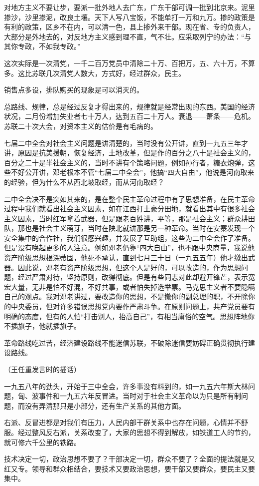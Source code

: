 对地方主义不要让步，要派一批外地人去广东，广东干部可调一批到北京来。泥里掺沙，沙里掺泥，改良土壤。天下人写八宝饭，不能单打一万和九万。掺的政策是有利的政策，区乡不在内，可以清一色，县上掺外来干部。现在省、专的负责人，大部分是外地去的，对反地方主义感到理不直，气不壮。应采取列宁的办法：“与其你专政，不如我专政。”

这次实际是一次清党，一千二百万党员中清除二十万、百把万，五、六十万，不算多。这比苏联几次清党人数大，方式好，经过群众，民主。

销售点多设，排队购买的现象是可以消灭的。

总路线、规律，总是经过反复才得出来的，规律就是经常出现的东西。美国的经济状况，二月份增加失业者七十万人，达到五百二十万人。衰退——萧条——危机。苏联二十次大会，对资本主义的估价是有毛病的。

七届二中全会对社会主义问题是讲清楚的，当时没有公开讲，直到一九五三年才讲，原因是抗美援朝，恢复经济，土地改革，但是作的百分之八十是社会主义的，百分之二十是半社会主义的，当时不讲有个策略问题，例如孙行者，糖衣炮弹，这些不好公开讲，邓老根本不管“七届二中全会”，他搞“四大自由”，他说是河南取来的经验，但为什么不从西北坡取经，而从河南取经？

二中全会决不是突如其来的，是在整个民主革命过程中有了思想准备，在民主革命过程中我们就看出社会主义因素，如在江西打土豪分田地，就看出其中有很多社会主义因素，当时红军拿着武器，但是跟老百姓讲，平等，那是社会主义；群众耕田队，那也是社会主义萌芽，当时在陕北就讲那是另一种革命。当时在安寨发现一个安全集中的合作社，我们很感兴趣，并发展了互助组，这些为二中全会作了准备。但是没有唤起更多的人注意。例如邓老仍靠“四大自由”，也不跟中央商量，我说他资产阶级思想根深蒂固，他死不承认，直到七月三十日（一九五五年）他才缴出武器。因此说，邓老有资产阶级思想，但这个人是好的，可以改造的，作为思想问题，经过严肃对待，坚持原则，改得彻底。但是有些同志对此却避开锋芒，表示宽宏大量，无非是怕不好混，不好共事，或者怕失掉选举票。马克思主义者不要隐瞒自己的观点。我对邓老讲过，要改造你的思想，不是撤你的副总理的职，不开除你的中央委员，但对许多错误思想党内要作严肃斗争。在原则问题上，共产党员要有明确的态度，但有的人怕“打击别人，抬高自己”，有相当庸俗的空气。思想阵地你不插旗子，他就插旗子。

革命路线吃过苦，经济建设路线不能迷信苏联，不破除迷信要妨碍正确贯彻执行建设路线。

（王任重发言时的插话）

一九五八年的劲头，开始于三中全会，许多事没有料到的，如一九五六年斯大林问题，匈、波事件和一九五六年反冒进。当时对于社会主义革命以为只是所有制问题，而没有弄清那只是小部分，还有生产关系的其他方面。

右派、反冒进都是对我们有压力，人民内部干群关系中也存在问题，心情并不舒服。经过整风反右派，关系改变了，大家的思想不得到解放，如铁道工人的节约，就可修六千公里的铁路。

技术决定一切，政治思想不要了？干部决定一切，群众不要了？全面的提法就是又红又专。领导和群众相结合，要技术又要政治思想，要干部又要群众，要民主又要集中。


